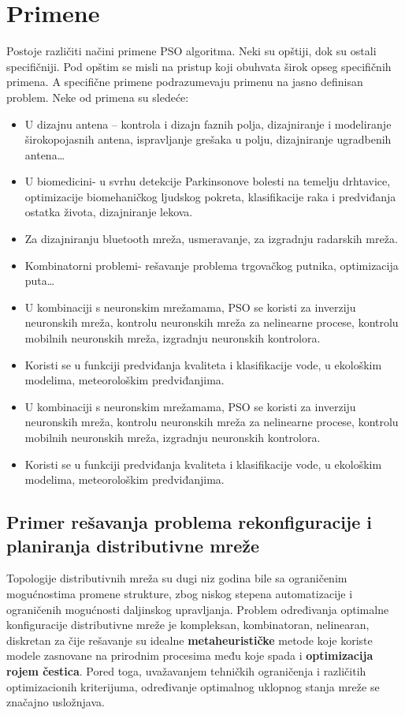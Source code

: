 \documentclass[a4paper]{article}
\begin{document}
\vspace{15mm}
\section{Primene}
Postoje različiti načini primene PSO algoritma. Neki su opštiji, dok su ostali specifičniji. Pod opštim se misli na pristup koji obuhvata širok opseg specifičnih primena. A specifične primene podrazumevaju primenu na jasno definisan problem.
Neke od primena su sledeće:
\begin{itemize}
    \item U dizajnu antena – kontrola i dizajn faznih polja, dizajniranje i modeliranje širokopojasnih antena, ispravljanje grešaka u polju, dizajniranje ugradbenih antena…
    \item U biomedicini- u svrhu detekcije Parkinsonove bolesti na temelju drhtavice, optimizacije biomehaničkog ljudskog pokreta, klasifikacije raka i predviđanja ostatka života, dizajniranje lekova.
    \item Za dizajniranju bluetooth mreža, usmeravanje, za izgradnju radarskih mreža.
    \item Kombinatorni problemi- rešavanje problema trgovačkog putnika, optimizacija puta…
    \item U kombinaciji s neuronskim mrežamama, PSO se koristi za inverziju neuronskih mreža, kontrolu neuronskih mreža za nelinearne procese,  kontrolu mobilnih neuronskih mreža, izgradnju neuronskih kontrolora.
    \item Koristi se u funkciji predviđanja kvaliteta i klasifikacije vode, u ekološkim modelima, meteorološkim predviđanjima.
    \item U kombinaciji s neuronskim mrežamama, PSO se koristi za inverziju neuronskih mreža, kontrolu neuronskih mreža za nelinearne procese,  kontrolu mobilnih neuronskih mreža, izgradnju neuronskih kontrolora.
    \item Koristi se u funkciji predviđanja kvaliteta i klasifikacije vode, u ekološkim modelima, meteorološkim predviđanjima.
     
   
\end{itemize}

\subsection{Primer rešavanja problema rekonfiguracije i planiranja distributivne mreže}
\vspace{5mm} 


Topologije distributivnih mreža su dugi niz godina bile sa ograničenim mogućnostima promene strukture, zbog niskog stepena automatizacije i ograničenih mogućnosti daljinskog upravljanja. 
Problem određivanja optimalne konfiguracije distributivne mreže je kompleksan, kombinatoran, nelinearan, diskretan za čije rešavanje su idealne \textbf{metaheurističke} metode koje koriste modele zasnovane na prirodnim procesima među koje spada i \textbf{optimizacija rojem čestica}. Pored toga, uvažavanjem tehničkih ograničenja i različitih optimizacionih kriterijuma, određivanje optimalnog uklopnog stanja mreže se značajno usložnjava.
\end{document}
